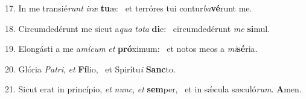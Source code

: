 17. In me transié\textit{runt} \textit{i}\textit{ræ} \textbf{tu}æ: \ast\  et terróres tui contur\textit{ba}\textbf{vé}runt me.\

18. Circumdedérunt me sicut a\textit{qua} \textit{to}\textit{ta} \textbf{di}e: \ast\  circumdedérunt \textit{me} \textbf{si}mul.\

19. Elongásti a me a\textit{mí}\textit{cum} \textit{et} \textbf{pró}ximum: \ast\  et notos meos a \textit{mi}\textbf{sé}ria.\

20. Glória \textit{Pa}\textit{tri}, \textit{et} \textbf{Fí}lio, \ast\  et Spirítu\textit{i} \textbf{Sanc}to.\

21. Sicut erat in princípio, \textit{et} \textit{nunc}, \textit{et} \textbf{sem}per, \ast\  et in sǽcula sæculó\textit{rum}. \textbf{A}men.\

